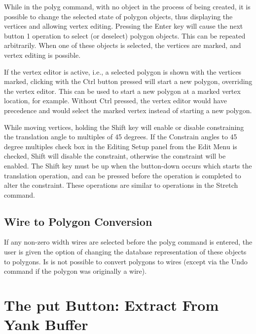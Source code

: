 While in the {\cb polyg} command, with no object in the process of
being created, it is possible to change the selected state of polygon
objects, thus displaying the vertices and allowing vertex editing. 
Pressing the {\kb Enter} key will cause the next button 1 operation to
select (or deselect) polygon objects.  This can be repeated
arbitrarily.  When one of these objects is selected, the vertices are
marked, and vertex editing is possible.

If the vertex editor is active, i.e., a selected polygon is shown with
the vertices marked, clicking with the {\cb Ctrl} button pressed will
start a new polygon, overriding the vertex editor.  This can be used
to start a new polygon at a marked vertex location, for example. 
Without {\cb Ctrl} pressed, the vertex editor would have precedence
and would select the marked vertex instead of starting a new polygon.

While moving vertices, holding the {\kb Shift} key will enable or
disable constraining the translation angle to multiples of 45 degrees. 
If the {\cb Constrain angles to 45 degree multiples} check box in the
{\cb Editing Setup} panel from the {\cb Edit Menu} is checked, {\kb
Shift} will disable the constraint, otherwise the constraint will be
enabled.  The {\kb Shift} key must be up when the button-down occurs
which starts the translation operation, and can be pressed before the
operation is completed to alter the constraint.  These operations are
similar to operations in the {\cb Stretch} command.

\subsection{Wire to Polygon Conversion}

If any non-zero width wires are selected before the {\cb polyg}
command is entered, the user is given the option of changing the
database representation of these objects to polygons.  Is is not
possible to convert polygons to wires (except via the {\cb Undo}
command if the polygon was originally a wire).


\section{The {\cb put} Button: Extract From Yank Buffer}

